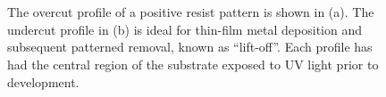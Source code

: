 \documentclass[
  a4paper,
]{scrbook}
\begin{document}
\begin{figure}
\begin{minipage}[t]{0.03\linewidth}
{\centering 


}

\end{minipage}%
%
\begin{minipage}[t]{0.01\linewidth}

{\centering 

~

}

\end{minipage}%
%
\begin{minipage}[t]{0.45\linewidth}

{\centering 


}

\end{minipage}%
%
\begin{minipage}[t]{0.01\linewidth}

{\centering 

~

}

\end{minipage}%

\caption{\label{fig-photolithography-profiles}The overcut profile of a
positive resist pattern is shown in (a). The undercut profile in (b) is
ideal for thin-film metal deposition and subsequent patterned removal,
known as ``lift-off''. Each profile has had the central region of the
substrate exposed to UV light prior to development.}

\end{figure}
\end{document}
